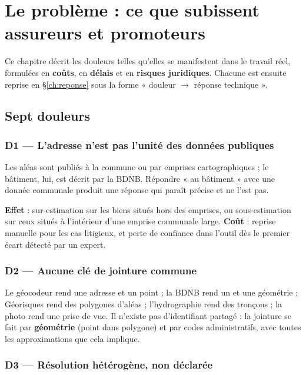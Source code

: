 \chapter{Le problème : ce que subissent assureurs et promoteurs}
\label{ch:douleurs}

Ce chapitre décrit les douleurs telles qu'elles se manifestent dans le travail
réel, formulées en \textbf{coûts}, en \textbf{délais} et en \textbf{risques
juridiques}. Chacune est ensuite reprise en \S\ref{ch:reponse} sous la forme
« douleur \(\rightarrow\) réponse technique ».

\section{Sept douleurs}

\subsection{D1 — L'adresse n'est pas l'unité des données publiques}

Les aléas sont publiés à la commune ou par emprises cartographiques ; le
bâtiment, lui, est décrit par la BDNB. Répondre « au bâtiment » avec une donnée
communale produit une réponse qui paraît précise et ne l'est pas.

\begin{douleur}[title={D1 — Granularité inadaptée}]
\textbf{Effet} : sur-estimation sur les biens situés hors des emprises, ou
sous-estimation sur ceux situés à l'intérieur d'une emprise communale large.
\textbf{Coût} : reprise manuelle pour les cas litigieux, et perte de confiance
dans l'outil dès le premier écart détecté par un expert.
\end{douleur}

\subsection{D2 — Aucune clé de jointure commune}

Le géocodeur rend une adresse et un point ; la BDNB rend un
 et une géométrie ; Géorisques rend des polygones
d'aléas ; l'hydrographie rend des tronçons ; la photo rend une prise de vue. Il
n'existe pas d'identifiant partagé : la jointure se fait par
\textbf{géométrie} (point dans polygone) et par codes administratifs, avec toutes
les approximations que cela implique.

\subsection{D3 — Résolution hétérogène, non déclarée}

